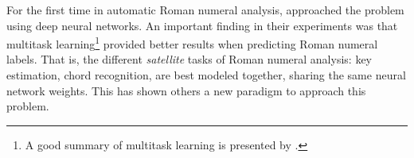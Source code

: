 

For the first time in automatic Roman numeral analysis,
\textcite{chen2018functional} approached the problem using
deep neural networks. An important finding in their
experiments was that multitask learning\footnote{A good
summary of multitask learning is presented by
\textcite{ruder2017overview}.} provided better results when
predicting Roman numeral labels. That is, the different
\emph{satellite} tasks of Roman numeral analysis: key
estimation, chord recognition, are best modeled together,
sharing the same neural network weights. This has shown
others a new paradigm to approach this problem.
